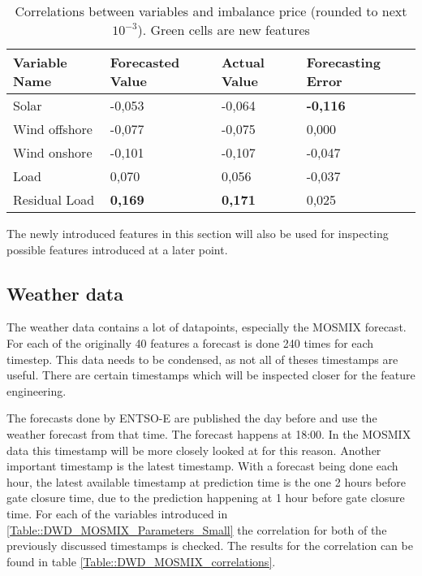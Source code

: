 \documentclass[class=scrbook, crop=false]{standalone}
\begin{document}
    \begin{table}
    \begin{tabular}{l|l|l|l}
    Variable Name &Forecasted Value& Actual Value& Forecasting Error \\\hline
    Solar &-0,053& -0,064& \cellcolor{green} \textbf{-0,116} \\
    Wind offshore & -0,077&-0,075& \cellcolor{green} 0,000 \\
    Wind onshore &-0,101&-0,107& \cellcolor{green} -0,047 \\
    Load &0,070&0,056& \cellcolor{green} -0,037 \\
    Residual Load & \cellcolor{green} \textbf{0,169}& \cellcolor{green} \textbf{0,171}& \cellcolor{green}0,025\\
    \end{tabular}
    
    \caption{Correlations between variables and imbalance price (rounded to next $10^{-3}$). Green cells are new features}
    \label{Table::Rebap_Correlations_ENTSOE}
    \end{table}
    
    The newly introduced features in this section will also be used for inspecting possible features introduced at a later point.
    
    \subsection{Weather data}
    \label{Section::Weather_data}
    The weather data contains a lot of datapoints, especially the MOSMIX forecast. 
    For each of the originally 40 features a forecast is done 240 times for each timestep. 
    This data needs to be condensed, as not all of theses timestamps are useful.
    There are certain timestamps which will be inspected closer for the feature engineering.
    
    The forecasts done by ENTSO-E are published the day before and use the weather forecast from that time.
    The forecast happens at 18:00. 
    In the MOSMIX data this timestamp will be more closely looked at for this reason.
    Another important timestamp is the latest timestamp. 
    With a forecast being done each hour, the latest available timestamp at prediction time is the one 2 hours before gate closure time, due to the prediction happening at 1 hour before gate closure time.
    For each of the variables introduced in \ref{Table::DWD_MOSMIX_Parameters_Small} the correlation for both of the previously discussed timestamps is checked.
    The results for the correlation can be found in table \ref{Table::DWD_MOSMIX_correlations}. 
    
\end{document}
